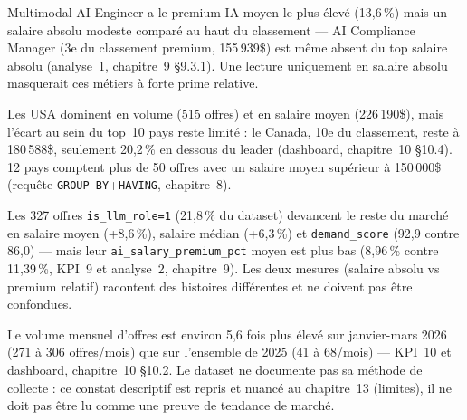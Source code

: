 \begin{constat}
Multimodal AI Engineer a le premium IA moyen le plus élevé (13,6\,\%)
mais un salaire absolu modeste comparé au haut du classement — AI
Compliance Manager (3e du classement premium, 155\,939\$) est même
absent du top salaire absolu (analyse~1, chapitre~9 §9.3.1). Une
lecture uniquement en salaire absolu masquerait ces métiers à forte
prime relative.
\end{constat}

\begin{constat}
Les USA dominent en volume (515 offres) et en salaire moyen
(226\,190\$), mais l'écart au sein du top~10 pays reste limité : le
Canada, 10e du classement, reste à 180\,588\$, seulement 20,2\,\% en
dessous du leader (dashboard, chapitre~10 §10.4). 12 pays comptent plus
de 50 offres avec un salaire moyen supérieur à 150\,000\$ (requête
\texttt{GROUP BY}+\texttt{HAVING}, chapitre~8).
\end{constat}

\begin{constat}
Les 327 offres \texttt{is\_llm\_role=1} (21,8\,\% du dataset) devancent
le reste du marché en salaire moyen (+8,6\,\%), salaire médian
(+6,3\,\%) et \texttt{demand\_score} (92,9 contre 86,0) — mais leur
\texttt{ai\_salary\_premium\_pct} moyen est plus bas (8,96\,\% contre
11,39\,\%, KPI~9 et analyse~2, chapitre~9). Les deux mesures (salaire
absolu vs premium relatif) racontent des histoires différentes et ne
doivent pas être confondues.
\end{constat}

\begin{constat}
Le volume mensuel d'offres est environ 5,6 fois plus élevé sur
janvier-mars 2026 (271 à 306 offres/mois) que sur l'ensemble de 2025
(41 à 68/mois) — KPI~10 et dashboard, chapitre~10 §10.2. Le dataset ne
documente pas sa méthode de collecte : ce constat descriptif est repris
et nuancé au chapitre~13 (limites), il ne doit pas être lu comme une
preuve de tendance de marché.
\end{constat}
